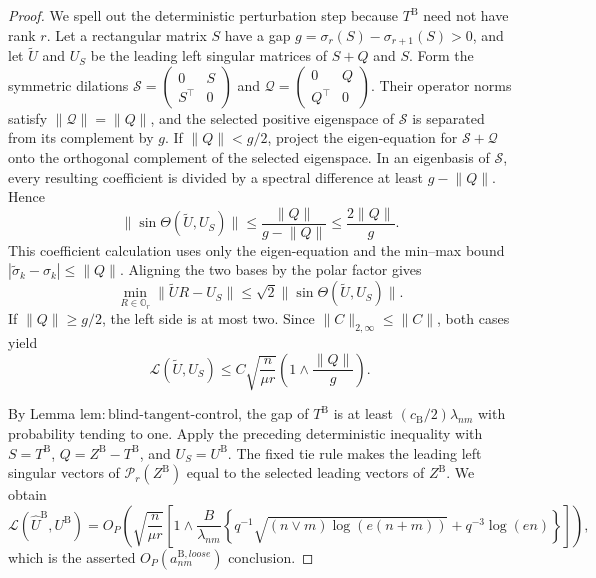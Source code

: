\documentclass{article}
\begin{document}
\begin{proof}
We spell out the deterministic perturbation step because \(T^{\mathrm B}\) need not have rank \(r\).  Let a rectangular matrix \(S\) have a gap \(g=\sigma_r(S)-\sigma_{r+1}(S)>0\), and let \(\widetilde U\) and \(U_S\) be the leading left singular matrices of \(S+Q\) and \(S\).  Form the symmetric dilations \(\mathscr S=\left(\begin{smallmatrix}0&S\\S^\top&0\end{smallmatrix}\right)\) and \(\mathscr Q=\left(\begin{smallmatrix}0&Q\\Q^\top&0\end{smallmatrix}\right)\).  Their operator norms satisfy \(\lVert\mathscr Q\rVert=\lVert Q\rVert\), and the selected positive eigenspace of \(\mathscr S\) is separated from its complement by \(g\).  If \(\lVert Q\rVert<g/2\), project the eigen-equation for \(\mathscr S+\mathscr Q\) onto the orthogonal complement of the selected eigenspace.  In an eigenbasis of \(\mathscr S\), every resulting coefficient is divided by a spectral difference at least \(g-\lVert Q\rVert\).  Hence
\[
 \lVert\sin\Theta(\widetilde U,U_S)\rVert
 \le \frac{\lVert Q\rVert}{g-\lVert Q\rVert}
 \le\frac{2\lVert Q\rVert}{g}.
\]
This coefficient calculation uses only the eigen-equation and the min--max bound \(|\widetilde\sigma_k-\sigma_k|\le\lVert Q\rVert\).  Aligning the two bases by the polar factor gives
\[
 \min_{R\in\mathbb O_r}\lVert\widetilde U R-U_S\rVert
 \le\sqrt2\lVert\sin\Theta(\widetilde U,U_S)\rVert.
\]
If \(\lVert Q\rVert\ge g/2\), the left side is at most two.  Since \(\lVert C\rVert_{2,\infty}\le\lVert C\rVert\), both cases yield
\[
 \mathcal L(\widetilde U,U_S)
 \le C\sqrt{\frac n{\mu r}}
 \left(1\wedge\frac{\lVert Q\rVert}{g}\right).
\]

By Lemma \(\mathrm{lem:blind\mbox{-}tangent\mbox{-}control}\), the gap of \(T^{\mathrm B}\) is at least \((c_{\mathrm B}/2)\lambda_{nm}\) with probability tending to one.  Apply the preceding deterministic inequality with \(S=T^{\mathrm B}\), \(Q=Z^{\mathrm B}-T^{\mathrm B}\), and \(U_S=U^{\mathrm B}\).  The fixed tie rule makes the leading left singular vectors of \(\mathcal P_r(Z^{\mathrm B})\) equal to the selected leading vectors of \(Z^{\mathrm B}\).  We obtain
\[
 \mathcal L(\widehat U^{\mathrm B},U^{\mathrm B})
 =O_P\!\left(
 \sqrt{\frac n{\mu r}}\left[1\wedge
 \frac B{\lambda_{nm}}\left\{
 q^{-1}\sqrt{(n\vee m)\log(e(n+m))}
 +q^{-3}\log(en)\right\}\right]\right),
\]
which is the asserted \(O_P(a^{\mathrm B,loose}_{nm})\) conclusion.


\end{proof}
\end{document}
